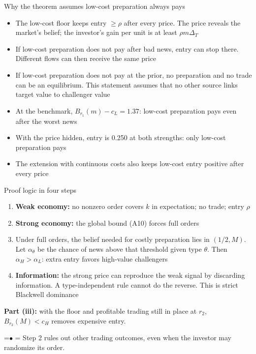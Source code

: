 \documentclass[10pt,aspectratio=169]{beamer}
\newcommand{\Cost}[1]{\textcolor{cCost}{#1}}
\newcommand{\TakeawayBody}[1]{\begin{minipage}{\textwidth}\raggedright\normalsize
    \setbox0=\hbox{{\usebeamercolor[fg]{structure}\raise0.7pt\hbox{\scriptsize$\bullet$}}\hspace{0.55em}}%
    \hangindent=\wd0 \hangafter=1 \noindent\box0 #1\par
  \end{minipage}}
\renewcommand{\Takeaway}[2][\ExhibitReadingGap]{\par\vspace{#1}\noindent\TakeawayBody{#2}\par}
\newcommand{\NavGap}{\par\vspace{0.45cm}}%
\let\AdapterBackButton\BackButton
\renewcommand{\BackButton}[1]{\NavGap\AdapterBackButton{#1}}%
\begin{document}
\begin{frame}[label=A15]{Why the theorem assumes low-cost preparation always pays}
\hypertarget{app:floor}{}
\begin{itemize}\setlength{\itemsep}{6pt}
\item The \Cost{low-cost floor} keeps entry $\ge\rho$ after every price. The price reveals the market's belief; the investor's gain per unit is at least $\rho m\Delta_T$
\item If low-cost preparation does not pay after bad news, entry can stop there. Different flows can then receive the same price
\item If low-cost preparation does not pay at the prior, no preparation and no trade can be an equilibrium. This statement assumes that no other source links target value to challenger value
\item At the benchmark, $B_{r_1}(m)-c_L=1.37$: low-cost preparation pays even after the worst news %
\item With the price hidden, entry is 0.250 %
at both strengths: only low-cost preparation pays
\item The extension with continuous costs also keeps low-cost entry positive after every price
\end{itemize}
\end{frame}

\begin{frame}[label=A16]{Proof logic in four steps}
\hypertarget{app:proof}{}
\begin{enumerate}\setlength{\itemsep}{5pt}
\item \textbf{Weak economy:} no nonzero order covers $k$ in expectation; no trade; entry $\rho$
\item \textbf{Strong economy:} the global bound (A10) forces full orders
\item Under full orders, the belief needed for costly preparation lies in $(1/2,M)$. Let $\alpha_\theta$ be the chance of news above that threshold given type $\theta$. Then $\alpha_H>\alpha_L$: extra entry favors high-value challengers
\item \textbf{Information:} the strong price can reproduce the weak signal by discarding information. A type-independent rule cannot do the reverse. This is strict Blackwell dominance
\end{enumerate}
\medskip
\textbf{Part (iii):} with the floor and profitable trading still in place at $r_2$, $B_{r_2}(M)<c_H$ removes expensive entry.
\Takeaway{Step 2 rules out other trading outcomes, even when the investor may randomize its order.}
\end{frame}
\end{document}
